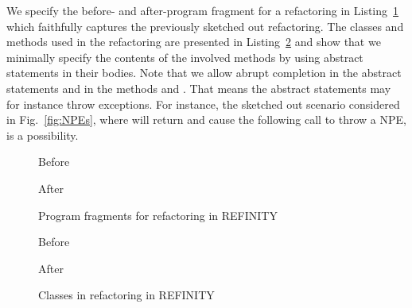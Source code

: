 We specify the before- and after-program fragment for a  refactoring in Listing~\ref{lst:HideDelegate-nofields-refinity} which faithfully captures the previously sketched out refactoring.
The classes and methods used in the refactoring are presented in Listing~\ref{lst:HideDelegate-nofields-classes-refinity} and show that we minimally specify the contents of the involved methods by using abstract
statements in their bodies.
Note that we allow abrupt completion in the abstract statements  and  in the methods  and .
That means the abstract statements may for instance throw exceptions.  For instance, the sketched out scenario considered in Fig.~\ref{fig:NPEs}, where  will return  and cause the following call to throw a NPE, is a possibility.

\begin{figure}[tbp]
  \captionsetup{type=lstlisting}
  \centering
  \begin{sublstlisting}[b]{.455\linewidth}
    
    \caption{Before}
    \label{lst:HideDelegate-nofields-before-refinity}
  \end{sublstlisting}\hspace{1cm}
  \begin{sublstlisting}[b]{.455\linewidth}
    
    \caption{After}
    \label{lst:HideDelegate-nofields-after-refinity}
  \end{sublstlisting}
\caption{Program fragments for  refactoring in REFINITY}
\label{lst:HideDelegate-nofields-refinity}
\end{figure}

\begin{figure}[tbp]
  \captionsetup{type=lstlisting}
  \centering
  \begin{sublstlisting}[b]{.4\linewidth}
    
    \caption{Before}
    \label{lst:HideDelegate-nofields-resource-refinity}
  \end{sublstlisting}\hspace{1cm}
  \begin{sublstlisting}[b]{.4\linewidth}
    
    \caption{After}
    \label{lst:HideDelegate-nofields-owner-refinity}
  \end{sublstlisting}
\caption{Classes in  refactoring in REFINITY}
\label{lst:HideDelegate-nofields-classes-refinity}
\end{figure}



